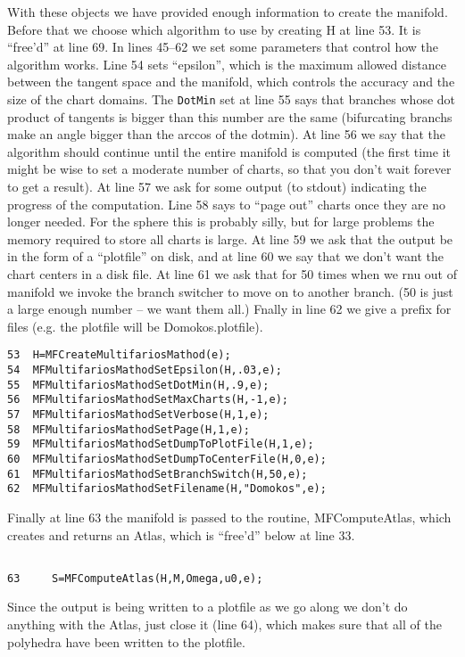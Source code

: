 \documentclass[12pt]{article}
\begin{document}
With these objects we have provided enough information to create the manifold.
Before that we choose which algorithm to use by creating H at line 53. It is
``free'd'' at line 69. In lines 45--62 we set some parameters that control how
the algorithm works. Line 54 sets ``epsilon'', which is the maximum allowed
distance between the tangent space and the manifold, which controls the 
accuracy and the size of the chart domains. The {\tt DotMin} set at line
55 says that branches whose dot product of tangents is bigger than this number
are the same (bifurcating branchs make an angle bigger than the arccos of the dotmin).
At line 56 we say that the algorithm
should continue until the entire manifold is computed (the first time it might
be wise to set a moderate number of charts, so that you don't wait forever
to get a result). At line 57 we ask for some output (to stdout) indicating
the progress of the computation. Line 58 says to ``page out'' charts once they
are no longer needed. For the sphere this is probably silly, but for large 
problems the memory required to store all charts is large. At line 59 we
ask that the output be in the form of a ``plotfile'' on disk, and at line 60 
we say that we don't want the chart centers in a disk file. At line 61 we
ask that for 50 times when we rnu out of manifold we invoke the branch switcher to
move on to another branch. (50 is just a large enough number -- we want them all.)
Fnally in line 62 we give a prefix for files (e.g. the plotfile will be Domokos.plotfile).
\begin{verbatim}
53  H=MFCreateMultifariosMathod(e);
54  MFMultifariosMathodSetEpsilon(H,.03,e);
55  MFMultifariosMathodSetDotMin(H,.9,e);
56  MFMultifariosMathodSetMaxCharts(H,-1,e);
57  MFMultifariosMathodSetVerbose(H,1,e);
58  MFMultifariosMathodSetPage(H,1,e);
59  MFMultifariosMathodSetDumpToPlotFile(H,1,e);
60  MFMultifariosMathodSetDumpToCenterFile(H,0,e);
61  MFMultifariosMathodSetBranchSwitch(H,50,e);
62  MFMultifariosMathodSetFilename(H,"Domokos",e);
\end{verbatim}
Finally at line 63 the manifold is passed to the routine, {MFComputeAtlas}, 
which creates and returns an Atlas, which is ``free'd'' below at line 33.
\begin{verbatim}

63     S=MFComputeAtlas(H,M,Omega,u0,e);
\end{verbatim}
Since the
output is being written to a plotfile as we go along we don't do anything
with the Atlas, just close it (line 64), which makes sure that all of the 
polyhedra have been written to the plotfile.
\end{document}
